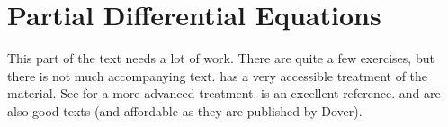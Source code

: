 \part{Partial Differential Equations}


This part of the text needs a lot of work.  There are quite a few exercises,
but there is not much accompanying text.  \cite{haberman:2003} has a very
accessible treatment of the material.  See \cite{garabedian:1998} for 
a more advanced treatment.  \cite{zwillinger:1992} is an excellent reference.
\cite{weinberger:1965} and \cite{guenther:1988} are also good texts (and
affordable as they are published by Dover).


         


























